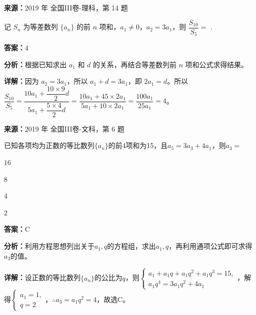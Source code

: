 \begin{question}[points=5]
\textbf{来源：}2019 年 全国III卷-理科，第 14 题\par
记 $S_n$ 为等差数列 $\{a_n\}$ 的前 $n$ 项和，$a_1\neq 0$，$a_2 = 3a_1$，则 $\dfrac{S_{10}}{S_5}=$ .
\fillin[{$4$}]
\begin{solution}
\textbf{答案：}$4$

\textbf{分析：}根据已知求出 $a_1$ 和 $d$ 的关系，再结合等差数列前 $n$ 项和公式求得结果。

\textbf{详解：}因为 $a_2 = 3a_1$，所以 $a_1 + d = 3a_1$，即 $2a_1 = d$。所以 $\dfrac{S_{10}}{S_5} = \dfrac{10a_1 + \dfrac{10\times 9}{2}d}{5a_1 + \dfrac{5\times 4}{2}d} = \dfrac{10a_1 + 45\times 2a_1}{5a_1 + 10\times 2a_1} = \dfrac{100a_1}{25a_1} = 4$。
\end{solution}
\end{question}

\begin{question}[points=5]
\textbf{来源：}2019 年 全国III卷-文科，第 6 题\par
已知各项均为正数的等比数列$\{a_n\}$的前4项和为15，且$a_5=3a_3+4a_1$，则$a_3=$
\begin{choices}
  \item $16$
  \item $8$
  \item $4$
  \item $2$
\end{choices}
\begin{solution}
\textbf{答案：}C

\textbf{分析：}利用方程思想列出关于$a_1,q$的方程组，求出$a_1,q$，再利用通项公式即可求得$a_3$的值。

\textbf{详解：}设正数的等比数列$\{a_n\}$的公比为$q$，则$\begin{cases} a_1+a_1q+a_1q^2+a_1q^3=15, \\ a_1q^4=3a_1q^2+4a_1 \end{cases}$，解得$\begin{cases} a_1=1, \\ q=2 \end{cases}$，$\therefore a_3=a_1q^2=4$，故选C。
\end{solution}
\end{question}

